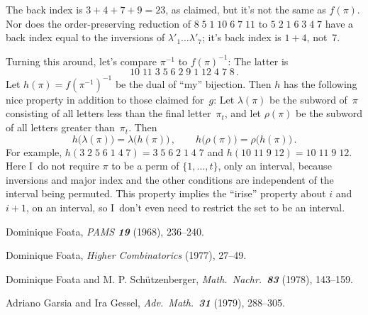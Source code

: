 The back index is $3+4+7+9=23$, as claimed, but it's not the same as $f(\pi)$.
Nor does the order-preserving reduction of $8\;5\;1\;10\;6\;7\;11$ to
$5\;2\;1\;6\;3\;4\;7$ have a back index equal to the inversions of
$\lambda'_1\ldots\lambda'_7$; it's back index is $1+4$, not~7.

Turning this around, let's compare $\pi^{-1}$ to $f(\pi)^{-1}$: The latter is
$$10\;11\;3\;5\;6\;2\;9\;1\;12\;4\;7\;8\,.$$
Let $h(\pi)=f(\pi^{-1})^{-1}$ be the dual of ``my'' bijection. Then $h$ has
the following nice property in addition to those claimed for~$g$: Let
$\lambda(\pi)$ be the subword of~$\pi$ consisting of all letters less
than the final letter~$\pi_t$, and let $\rho(\pi)$ be the subword of all
letters greater than~$\pi_t$. Then
$$h\bigl(\lambda(\pi)\bigr)=\lambda\bigl(h(\pi)\bigr)\,,\qquad
h\bigl(\rho(\pi)\bigr)=\rho\bigl(h(\pi)\bigr)\,.$$
For example, $h(3\;2\;5\;6\;1\;4\;7)=3\;5\;6\;2\;1\;4\;7$ and
$h(10\;11\;9\;12)=10\;11\;9\;12$. Here I~do not require $\pi$ to be a perm of
$\{1,\ldots,t\}$, only an interval, because inversions and major index and the
other conditions are independent of the interval being permuted.
This property implies the ``irise'' property about $i$ and $i+1$, on an
interval, so I~don't even need to restrict the set to be an interval.

\bigskip
{}

Dominique Foata, {\sl PAMS\/ \bf 19} (1968), 236--240.

Dominique Foata, {\sl Higher Combinatorics\/} (1977), 27--49.

Dominique Foata and M. P.
Sch\"utzenberger, {\sl Math.\ Nachr.\ \bf 83} (1978), 143--159.

Adriano Garsia and Ira Gessel, {\sl Adv.\ Math.\ \bf 31} (1979), 288--305.



\bye


